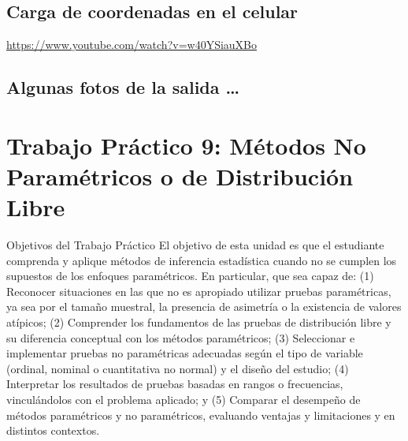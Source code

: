 \documentclass[
  spanish,
  letterpaper,
  DIV=11,
  numbers=noendperiod]{scrreprt}
\begin{document}
\section{Carga de coordenadas en el
celular}\label{carga-de-coordenadas-en-el-celular}

\url{https://www.youtube.com/watch?v=w40YSiauXBo}

\section{Algunas fotos de la salida
\ldots{}}\label{algunas-fotos-de-la-salida}


\chapter{Trabajo Práctico 9: Métodos No Paramétricos o de Distribución
Libre}\label{trabajo-pruxe1ctico-9-muxe9todos-no-paramuxe9tricos-o-de-distribuciuxf3n-libre}

Objetivos del Trabajo Práctico El objetivo de esta unidad es que el
estudiante comprenda y aplique métodos de inferencia estadística cuando
no se cumplen los supuestos de los enfoques paramétricos. En particular,
que sea capaz de: (1) Reconocer situaciones en las que no es apropiado
utilizar pruebas paramétricas, ya sea por el tamaño muestral, la
presencia de asimetría o la existencia de valores atípicos; (2)
Comprender los fundamentos de las pruebas de distribución libre y su
diferencia conceptual con los métodos paramétricos; (3) Seleccionar e
implementar pruebas no paramétricas adecuadas según el tipo de variable
(ordinal, nominal o cuantitativa no normal) y el diseño del estudio; (4)
Interpretar los resultados de pruebas basadas en rangos o frecuencias,
vinculándolos con el problema aplicado; y (5) Comparar el desempeño de
métodos paramétricos y no paramétricos, evaluando ventajas y
limitaciones y en distintos contextos.
\end{document}
